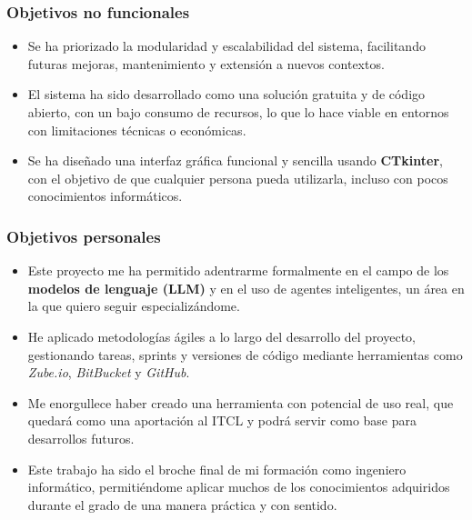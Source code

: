 \subsubsection{Objetivos no funcionales}

\begin{itemize}
    \item Se ha priorizado la modularidad y escalabilidad del sistema, facilitando futuras mejoras, mantenimiento y extensión a nuevos contextos.

    \item El sistema ha sido desarrollado como una solución gratuita y de código abierto, con un bajo consumo de recursos, lo que lo hace viable en entornos con limitaciones técnicas o económicas.

    \item Se ha diseñado una interfaz gráfica funcional y sencilla usando \textbf{CTkinter}, con el objetivo de que cualquier persona pueda utilizarla, incluso con pocos conocimientos informáticos.
\end{itemize}

\subsubsection{Objetivos personales}

\begin{itemize}
    \item Este proyecto me ha permitido adentrarme formalmente en el campo de los \textbf{modelos de lenguaje (LLM)} y en el uso de agentes inteligentes, un área en la que quiero seguir especializándome.

    \item He aplicado metodologías ágiles a lo largo del desarrollo del proyecto, gestionando tareas, sprints y versiones de código mediante herramientas como \textit{Zube.io}, \textit{BitBucket} y \textit{GitHub}.

    \item Me enorgullece haber creado una herramienta con potencial de uso real, que quedará como una aportación al ITCL y podrá servir como base para desarrollos futuros.

    \item Este trabajo ha sido el broche final de mi formación como ingeniero informático, permitiéndome aplicar muchos de los conocimientos adquiridos durante el grado de una manera práctica y con sentido.
\end{itemize}

